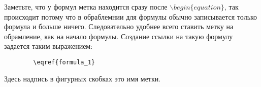     Заметьте, что у формул метка находится сразу после $\backslash begin\{equation\}$, так происходит потому что в обраблемнии для формулы обычно записывается только формула и больше ничего. Следовательно удобнее всего ставить метку на обрамление, как на начало формулы. Создание ссылки на такую формулу задается таким выражением:
    
    \begin{verbatim}
        \eqref{formula_1}
    \end{verbatim}
    
    Здесь надпись в фигурных скобках это имя метки.
    
